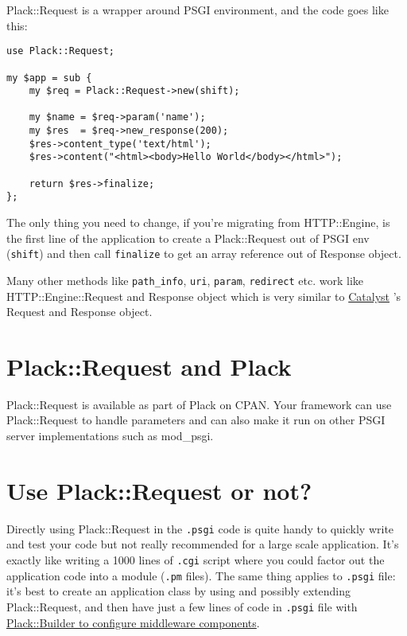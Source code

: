 Plack::Request is a wrapper around PSGI environment, and the code goes
like this:

\begin{lstlisting}
use Plack::Request;

my $app = sub {
    my $req = Plack::Request->new(shift);
    
    my $name = $req->param('name');
    my $res  = $req->new_response(200);
    $res->content_type('text/html');
    $res->content("<html><body>Hello World</body></html>");
    
    return $res->finalize;
};
\end{lstlisting}

The only thing you need to change, if you're migrating from
HTTP::Engine, is the first line of the application to create a
Plack::Request out of PSGI env (\lstinline!shift!) and then call
\lstinline!finalize! to get an array reference out of Response object.

Many other methods like \lstinline!path_info!, \lstinline!uri!,
\lstinline!param!, \lstinline!redirect! etc. work like
HTTP::Engine::Request and Response object which is very similar to
\href{http://search.cpan.org/dist/Catalyst-Runtime}{Catalyst} 's Request
and Response object.

\section{Plack::Request and Plack}\label{plackrequest-and-plack}

Plack::Request is available as part of Plack on CPAN. Your framework can
use Plack::Request to handle parameters and can also make it run on
other PSGI server implementations such as mod\_psgi.

\section{Use Plack::Request or not?}\label{use-plackrequest-or-not}

Directly using Plack::Request in the \lstinline!.psgi! code is quite
handy to quickly write and test your code but not really recommended for
a large scale application. It's exactly like writing a 1000 lines of
\lstinline!.cgi! script where you could factor out the application code
into a module (\lstinline!.pm! files). The same thing applies to
\lstinline!.psgi! file: it's best to create an application class by
using and possibly extending Plack::Request, and then have just a few
lines of code in \lstinline!.psgi! file with
\href{http://advent.plackperl.org/2009/12/day-11-using-plackbuilder.html}{Plack::Builder
to configure middleware components}.

